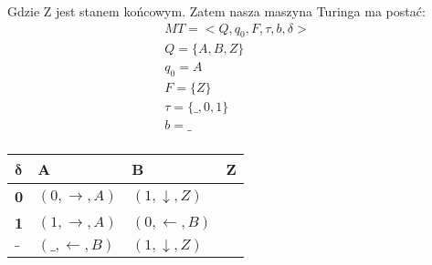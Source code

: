 \documentclass[main.tex]{subfiles}
\begin{document}
    Gdzie Z jest stanem końcowym. Zatem nasza maszyna Turinga ma postać:
    \begin{gather*}
        MT = <Q, q_0, F, \tau, b, \delta>\\
        Q = \{A, B, Z\}\\
        q_0 = A\\
        F = \{Z\}\\
        \tau = \{ \_, 0, 1\}\\
        b = \_ \\
    \end{gather*}
    \begin{table}[H]
        \begin{center}
            \begin{tabular}{| p{1cm} || p{5cm} | p{5cm} | p{1cm} |}
                \hline
                $\boldsymbol{\delta}$ & \textbf{A} & \textbf{B} & \textbf{Z}\\
                \hline
                \hline
                \textbf{0} & $(0, \rightarrow, A)$ & $(1, \downarrow, Z)$ &\\
                \hline
                \textbf{1} & $(1, \rightarrow, A)$ & $(0, \leftarrow, B)$ &\\
                \hline
                $\boldsymbol{\_}$ & $(\_, \leftarrow, B)$ & $(1, \downarrow, Z)$ &\\
                \hline
            \end{tabular}
        \end{center}
    \end{table}
\end{document}

